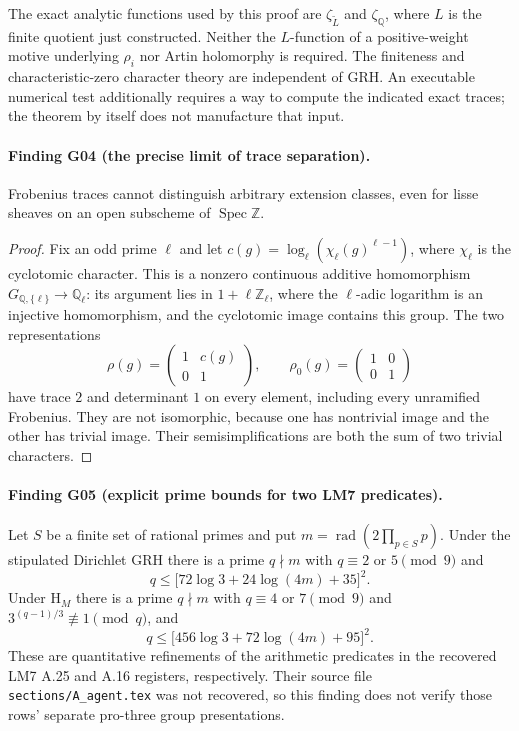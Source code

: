 \documentclass[11pt,a4paper]{article}
\begin{document}
The exact analytic functions used by this proof are $\zeta_{\widetilde L}$ and $\zeta_{\mathbb Q}$, where $L$ is the finite quotient just constructed.  Neither the $L$-function of a positive-weight motive underlying $\rho_i$ nor Artin holomorphy is required. The finiteness and characteristic-zero character theory are independent of GRH. An executable numerical test additionally requires a way to compute the indicated exact traces; the theorem by itself does not manufacture that input.

\paragraph{Finding G04 (the precise limit of trace separation).}
Frobenius traces cannot distinguish arbitrary extension classes, even for lisse sheaves on an open subscheme of $\operatorname{Spec}\mathbb Z$.

\begin{proof}
Fix an odd prime $\ell$ and let $c(g)=\log_\ell(\chi_\ell(g)^{\ell-1})$, where $\chi_\ell$ is the cyclotomic character. This is a nonzero continuous additive homomorphism $G_{\mathbb Q,\{\ell\}}\to\mathbb Q_\ell$: its argument lies in $1+\ell\mathbb Z_\ell$, where the $\ell$-adic logarithm is an injective homomorphism, and the cyclotomic image contains this group. The two representations
\[
 \rho(g)=\begin{pmatrix}1&c(g)\\0&1\end{pmatrix},
 \qquad \rho_0(g)=\begin{pmatrix}1&0\\0&1\end{pmatrix}
\]
have trace $2$ and determinant $1$ on every element, including every unramified Frobenius. They are not isomorphic, because one has nontrivial image and the other has trivial image. Their semisimplifications are both the sum of two trivial characters.
\end{proof}

\paragraph{Finding G05 (explicit prime bounds for two LM7 predicates).}
Let $S$ be a finite set of rational primes and put
$m=\operatorname{rad}(2\prod_{p\in S}p)$.  Under the stipulated
Dirichlet GRH there is a prime $q\nmid m$ with $q\equiv2$ or $5\pmod9$
and
\[
 q\le\bigl[72\log3+24\log(4m)+35\bigr]^2. \tag{G05.1}
\]
Under $\mathrm H_M$ there is a prime $q\nmid m$ with $q\equiv4$ or
$7\pmod9$ and $3^{(q-1)/3}\not\equiv1\pmod q$, and
\[
 q\le\bigl[456\log3+72\log(4m)+95\bigr]^2. \tag{G05.2}
\]
These are quantitative refinements of the arithmetic predicates in the
recovered LM7 A.25 and A.16 registers, respectively.  Their source file
\texttt{sections/A\_agent.tex} was not recovered, so this finding does
not verify those rows' separate pro-three group presentations.
\end{document}
